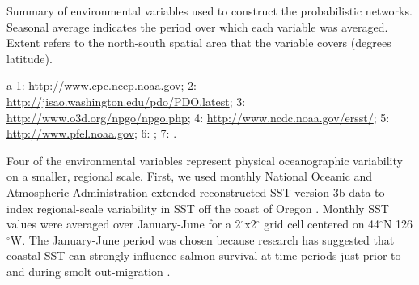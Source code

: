 \begin{table}[htbp]
  \small \centering \libertineLF
  \caption[Summary of environmental variables used to construct the
           probabilistic networks.]{Summary of environmental variables used to
           construct the probabilistic networks. Seasonal average indicates
           the period over which each variable was averaged. Extent refers to
           the north-south spatial area that the variable covers (degrees
           latitude).}
  \begin{threeparttable}
    
    \begin{tablenotes}
      {\footnotesize
        \item[a] 1: \url{http://www.cpc.ncep.noaa.gov};
                 2: \url{http://jisao.washington.edu/pdo/PDO.latest};
                 3: \url{http://www.o3d.org/npgo/npgo.php};
                 4: \url{http://www.ncdc.noaa.gov/ersst/};
                 5: \url{http://www.pfel.noaa.gov};
                 6: \citet{Peterson2012a};
                 7: \citet{PFMC2013}.
        }
    \end{tablenotes}
  \end{threeparttable}
  \label{tab:bn:1}
\end{table}

Four of the environmental variables represent physical oceanographic variability
on a smaller, regional scale. First, we used monthly National Oceanic and
Atmospheric Administration extended reconstructed SST version 3b data to index
regional-scale variability in SST off the coast of Oregon \citep{Smith2008a}.
Monthly SST values were averaged over January-June for a 2$^{\circ}$x2$^{\circ}$
grid cell centered on 44$^{\circ}$N 126$^{\circ}$W. The January-June period was
chosen because research has suggested that coastal SST can strongly influence
salmon survival at time periods just prior to and during smolt out-migration
\citep{Mueter2005a}.

